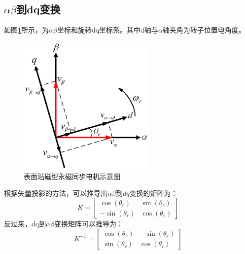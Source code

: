 \subsection{$\alpha\beta$到dq变换}
如图\ref{fig:dq}所示，为$\alpha\beta$坐标和旋转dq坐标系。其中d轴与$\alpha$轴夹角为转子位置电角度。
\begin{figure}[H]
	\centering
	\includegraphics[width=0.6\textwidth]{figs/dq.eps}
	\caption{表面贴磁型永磁同步电机示意图}
	\label{fig:dq}
\end{figure}
根据矢量投影的方法，可以推导出$\alpha\beta$到$dq$变换的矩阵为：
\begin{equation}\label{eq:dq}
K=\begin{bmatrix}\cos(\theta_{r})&\sin(\theta_{r})\\
-\sin(\theta_{r})&\cos(\theta_{r})
\end{bmatrix}
\end{equation}
反过来，dq到$\alpha\beta$变换矩阵可以推导为：
\begin{equation}\label{eq:inversedq}
K^{-1}=\begin{bmatrix}\cos(\theta_{r})&-\sin(\theta_{r})\\\sin(\theta_{r})&\cos(\theta_{r})
\end{bmatrix}
\end{equation}
